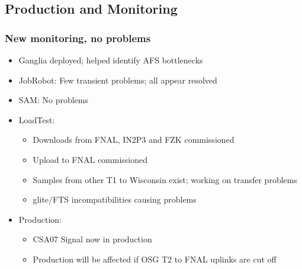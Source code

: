 \documentclass{beamer}
\begin{document}
\subsection{Production and Monitoring}
\begin{frame}
\frametitle{New monitoring, no problems}
\begin{itemize}
    \item Ganglia deployed; helped identify AFS bottlenecks
    \item JobRobot: Few transient problems; all appear resolved
    \item SAM: No problems
    \item LoadTest:
    \begin{itemize}
        \item Downloads from FNAL, IN2P3 and FZK commissioned
        \item Upload to FNAL commissioned
        \item Samples from other T1 to Wisconsin exist; working on transfer problems
        \item glite/FTS incompatibilities causing problems
    \end{itemize}
    \item Production:
    \begin{itemize}
        \item CSA07 Signal now in production
        \item Production will be affected if OSG T2 to FNAL uplinks are cut off
    \end{itemize}
\end{itemize}
\end{frame}
\end{document}
